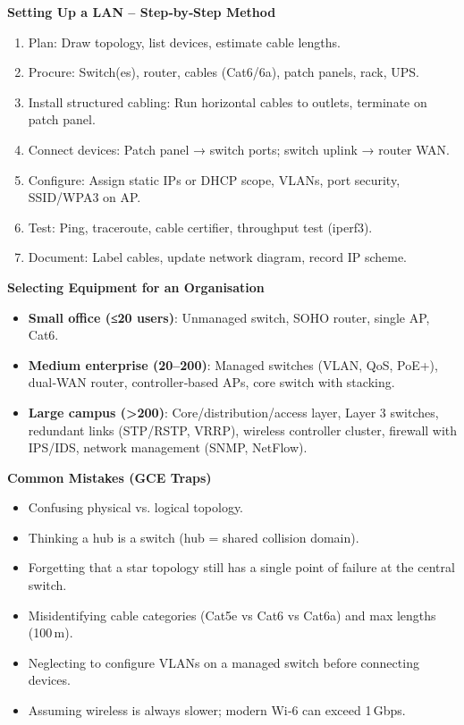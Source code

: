 \documentclass[11pt]{article}
\begin{document}
\begin{bilan}
\textbf{Setting Up a LAN – Step‑by‑Step Method}
\begin{enumerate}
\item Plan: Draw topology, list devices, estimate cable lengths.
\item Procure: Switch(es), router, cables (Cat6/6a), patch panels, rack, UPS.
\item Install structured cabling: Run horizontal cables to outlets, terminate on patch panel.
\item Connect devices: Patch panel → switch ports; switch uplink → router WAN.
\item Configure: Assign static IPs or DHCP scope, VLANs, port security, SSID/WPA3 on AP.
\item Test: Ping, traceroute, cable certifier, throughput test (iperf3).
\item Document: Label cables, update network diagram, record IP scheme.
\end{enumerate}

\textbf{Selecting Equipment for an Organisation}
\begin{itemize}
\item \textbf{Small office (≤20 users)}: Unmanaged switch, SOHO router, single AP, Cat6.
\item \textbf{Medium enterprise (20–200)}: Managed switches (VLAN, QoS, PoE+), dual‑WAN router, controller‑based APs, core switch with stacking.
\item \textbf{Large campus (>200)}: Core/distribution/access layer, Layer 3 switches, redundant links (STP/RSTP, VRRP), wireless controller cluster, firewall with IPS/IDS, network management (SNMP, NetFlow).
\end{itemize}

\textbf{Common Mistakes (GCE Traps)}
\begin{itemize}
\item Confusing physical vs. logical topology.
\item Thinking a hub is a switch (hub = shared collision domain).
\item Forgetting that a star topology still has a single point of failure at the central switch.
\item Misidentifying cable categories (Cat5e vs Cat6 vs Cat6a) and max lengths (100 m).
\item Neglecting to configure VLANs on a managed switch before connecting devices.
\item Assuming wireless is always slower; modern Wi‑6 can exceed 1 Gbps.
\end{itemize}


\end{bilan}
\end{document}
